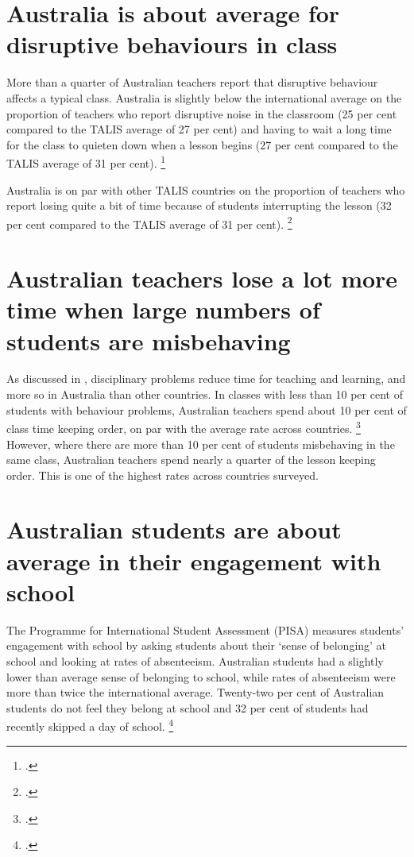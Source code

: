 \documentclass[FrontPage]{grattan}
\begin{document}
\section{Australia is about average for disruptive behaviours in class }\label{subsec:australia-about-average}
More than a quarter of Australian teachers report that disruptive behaviour affects a typical class. Australia is slightly below the international average on the proportion of teachers who report disruptive noise in the classroom (25 per cent compared to the TALIS average of 27 per cent) and having to wait a long time for the class to quieten down when a lesson begins (27 per cent compared to the TALIS average of 31 per cent).%
    \footcite{OECD2014TALIS2013ResultsTeachingLearning}

Australia is on par with other TALIS countries on the proportion of teachers who report losing quite a bit of time because of students interrupting the lesson (32 per cent compared to the TALIS average of 31 per cent).%
    \footcite[][Table 6.6]{OECD2014TALIS2013ResultsTeachingLearning}
\section{Australian teachers lose a lot more time when large numbers of students are misbehaving}\label{sec:australian-teachers-lose-time}
As discussed in , disciplinary problems reduce time for teaching and learning, and more so in Australia than other countries. In classes with less than 10 per cent of students with behaviour problems, Australian teachers spend about 10 per cent of class time keeping order, on par with the average rate across countries.
\footcite[][Table 6.7]{Freeman2014AustralianTeachersLearning}
However, where there are more than 10 per cent of students misbehaving in the same class, Australian teachers spend nearly a quarter of the lesson keeping order. This is one of the highest rates across countries surveyed.

\section{Australian students are about average in their engagement with school}\label{sec:australian-students-average-engagement}
The Programme for International Student Assessment (PISA) measures students’ engagement with school by asking students about their ‘sense of belonging’ at school and looking at rates of absenteeism. Australian students had a slightly lower than average sense of belonging to school, while rates of absenteeism were more than twice the international average. Twenty-two per cent of Australian students do not feel they belong at school and 32 per cent of students had recently skipped a day of school.%
    \footcite{OECD2013PISA2012ResultsReadyToLearn}

\printbibliography
\end{document}
